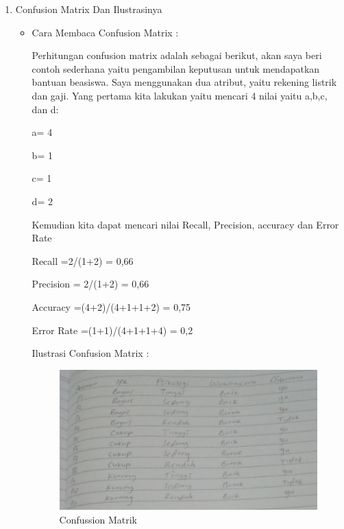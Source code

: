 \begin{enumerate}
\par
\item Confusion Matrix Dan Ilustrasinya
\begin{itemize}
\item Cara Membaca Confusion Matrix :
\par Perhitungan confusion matrix adalah sebagai berikut, akan saya beri contoh sederhana yaitu pengambilan keputusan untuk mendapatkan bantuan beasiswa. Saya menggunakan dua atribut, yaitu rekening listrik dan gaji. Yang pertama kita lakukan yaitu mencari 4 nilai yaitu a,b,c, dan d:
\par a= 4
\par b= 1
\par c= 1
\par d= 2
\par Kemudian kita dapat mencari nilai Recall, Precision, accuracy dan Error Rate
\par Recall =2/(1+2) = 0,66
\par Precision = 2/(1+2) = 0,66
\par Accuracy =(4+2)/(4+1+1+2) = 0,75
\par Error Rate =(1+1)/(4+1+1+4) = 0,2
\par Ilustrasi Confusion Matrix :
\par
\begin{figure}[!hbtp]
\centering
\includegraphics[scale=1]{figures/AIP/asm3.PNG}
\caption{Confussion Matrik}
\label{contoh}
\end{figure}
\end{itemize}


\end{enumerate}
